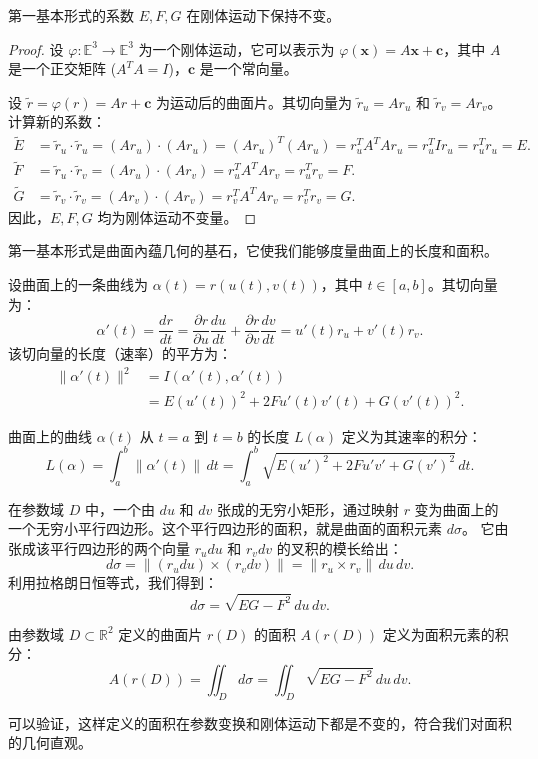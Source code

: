 \documentclass[lang=cn,10pt,thmcnt=section]{elegantbook}
\renewcommand{\vec}[1]{\mathbf{#1}}
\begin{document}
\begin{proposition}[刚体运动下的不变性]
    第一基本形式的系数 $E, F, G$ 在刚体运动下保持不变。
\end{proposition}
\begin{proof}
    设 $\varphi: \mathbb{E}^3 \to \mathbb{E}^3$ 为一个刚体运动，它可以表示为 $\varphi(\vec{x}) = A\vec{x} + \vec{c}$，其中 $A$ 是一个正交矩阵 ($A^T A = I$)，$\vec{c}$ 是一个常向量。
    
    设 $\tilde{r} = \varphi(r) = Ar + \vec{c}$ 为运动后的曲面片。其切向量为 $\tilde{r}_u = A r_u$ 和 $\tilde{r}_v = A r_v$。
    计算新的系数：
    \begin{align*}
        \tilde{E} &= \tilde{r}_u \cdot \tilde{r}_u = (A r_u) \cdot (A r_u) = (A r_u)^T (A r_u) = r_u^T A^T A r_u = r_u^T I r_u = r_u^T r_u = E. \\
        \tilde{F} &= \tilde{r}_u \cdot \tilde{r}_v = (A r_u) \cdot (A r_v) = r_u^T A^T A r_v = r_u^T r_v = F. \\
        \tilde{G} &= \tilde{r}_v \cdot \tilde{r}_v = (A r_v) \cdot (A r_v) = r_v^T A^T A r_v = r_v^T r_v = G.
    \end{align*}
    因此，$E, F, G$ 均为刚体运动不变量。
\end{proof}

第一基本形式是曲面內蕴几何的基石，它使我们能够度量曲面上的长度和面积。

设曲面上的一条曲线为 $\alpha(t) = r(u(t), v(t))$，其中 $t \in [a, b]$。其切向量为：
\[
\alpha'(t) = \frac{dr}{dt} = \frac{\partial r}{\partial u}\frac{du}{dt} + \frac{\partial r}{\partial v}\frac{dv}{dt} = u'(t) r_u + v'(t) r_v.
\]
该切向量的长度（速率）的平方为：
\begin{align*}
    \|\alpha'(t)\|^2 &= I(\alpha'(t), \alpha'(t)) \\
    &= E(u'(t))^2 + 2F u'(t)v'(t) + G(v'(t))^2.
\end{align*}

\begin{definition}[曲线长度]
    曲面上的曲线 $\alpha(t)$ 从 $t=a$ 到 $t=b$ 的长度 $L(\alpha)$ 定义为其速率的积分：
    \[
    L(\alpha) = \int_a^b \|\alpha'(t)\| \, dt = \int_a^b \sqrt{E(u')^2 + 2F u'v' + G(v')^2} \, dt.
    \]
\end{definition}
在参数域 $D$ 中，一个由 $du$ 和 $dv$ 张成的无穷小矩形，通过映射 $r$ 变为曲面上的一个无穷小平行四边形。这个平行四边形的面积，就是曲面的面积元素 $d\sigma$。
它由张成该平行四边形的两个向量 $r_u du$ 和 $r_v dv$ 的叉积的模长给出：
\[
d\sigma = \|(r_u du) \times (r_v dv)\| = \|r_u \times r_v\| \, du \, dv.
\]
利用拉格朗日恒等式，我们得到：
\[
d\sigma = \sqrt{EG - F^2} \, du \, dv.
\]
\begin{definition}[曲面面积]
    由参数域 $D \subset \mathbb{R}^2$ 定义的曲面片 $r(D)$ 的面积 $A(r(D))$ 定义为面积元素的积分：
    \[
    A(r(D)) = \iint_D d\sigma = \iint_D \sqrt{EG - F^2} \, du \, dv.
    \]
\end{definition}
\begin{remark}
    可以验证，这样定义的面积在参数变换和刚体运动下都是不变的，符合我们对面积的几何直观。
\end{remark}
\end{document}

